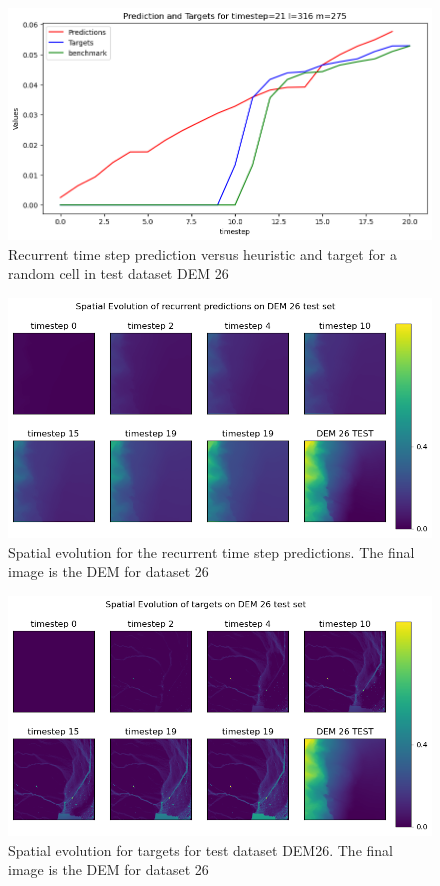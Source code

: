 \begin{figure}[tbph]
	\centering
	\includegraphics[width=0.8\linewidth, height=0.3\textheight]{Figures/Results/extra/extra_recurrent_step}
	\caption[Extra Recurrent Time Step Prediction]{Recurrent time step prediction versus heuristic and target for a random cell in test dataset DEM 26}
	\label{fig:extrarecurrentstep}
\end{figure}


\begin{figure}[tbph]
	\centering
	\includegraphics[width=0.8\linewidth, height=0.3\textheight]{Figures/Results/extra/Recurrent_Predictions_compare_dem}
	\caption[Recurrent Prediction vs DEM 26 map comparison]{Spatial evolution for the recurrent time step predictions. The final image is the DEM for dataset 26}
	\label{fig:recurrentpredictionscomparedem}
\end{figure}


\begin{figure}[tbph]
	\centering
	\includegraphics[width=0.8\linewidth, height=0.3\textheight]{Figures/Results/extra/Recurrent_targets_compare_dem}
	\caption[Targets for test dataset 26 comparison to DEM]{Spatial evolution for targets for test dataset DEM26. The final image is the DEM for dataset 26}
	\label{fig:recurrenttargetscomparedem}
\end{figure}


